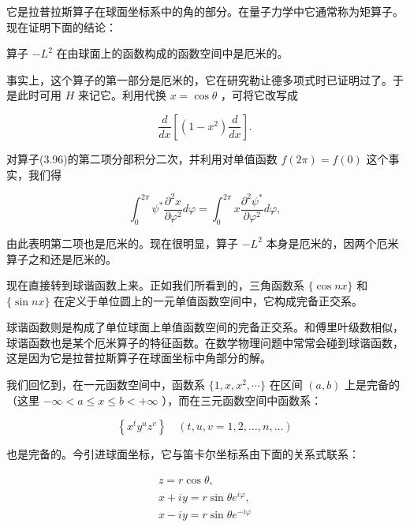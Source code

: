 它是拉普拉斯算子在球面坐标系中的角的部分。在量子力学中它通常称为矩算子。现在证明下面的结论：

算子 $-L^{2}$ 在由球面上的函数构成的函数空间中是厄米的。

事实上，这个算子的第一部分是厄米的，它在研究勒让德多项式时已证明过了。于是此时可用 $H$ 来记它。利用代换 $x = \cos \theta$ ，可将它改写成

\begin{equation*}
\frac {d}{d x} \left[ (1 - x ^ {2}) \frac {d}{d x} \right].
\end{equation*}

对算子(3.96)的第二项分部积分二次，并利用对单值函数 $f(2\pi)=f(0)$ 这个事实，我们得

\begin{equation*}
\int_ {0} ^ {2 \pi} \psi^ {*} \frac {\partial^ {2} x}{\partial \varphi^ {2}} d \varphi = \int_ {0} ^ {2 \pi} x \frac {\partial^ {2} \psi^ {*}}{\partial \varphi^ {2}} d \varphi ,
\end{equation*}

由此表明第二项也是厄米的。现在很明显，算子 $-L^{2}$ 本身是厄米的，因两个厄米算子之和还是厄米的。

现在直接转到球谐函数上来。正如我们所看到的，三角函数系 $\{\cos nx\}$ 和 $\{\sin nx\}$ 在定义于单位圆上的一元单值函数空间中，它构成完备正交系。

球谐函数则是构成了单位球面上单值函数空间的完备正交系。和傅里叶级数相似，球谐函数也是某个厄米算子的特征函数。在数学物理问题中常常会碰到球谐函数，这是因为它是拉普拉斯算子在球面坐标中角部分的解。

我们回忆到，在一元函数空间中，函数系 $\{1, x, x^{2}, \cdots\}$ 在区间 $(a, b)$ 上是完备的（这里 $-\infty < a \leqslant x \leqslant b < +\infty$ ），而在三元函数空间中函数系：

\begin{equation*}
\left\{x ^ {t} y ^ {u} z ^ {v} \right\} \quad (t, u, v = 1, 2, \dots , n, \dots)\tag{3.97}
\end{equation*}

也是完备的。今引进球面坐标，它与笛卡尔坐标系由下面的关系式联系：

\begin{equation*}
\begin{array}{c} z = r \cos \theta , \\ x + i y = r \sin \theta e ^ {i \varphi}, \\ x - i y = r \sin \theta e ^ {- i \varphi} \end{array}\tag{3.98}
\end{equation*}

